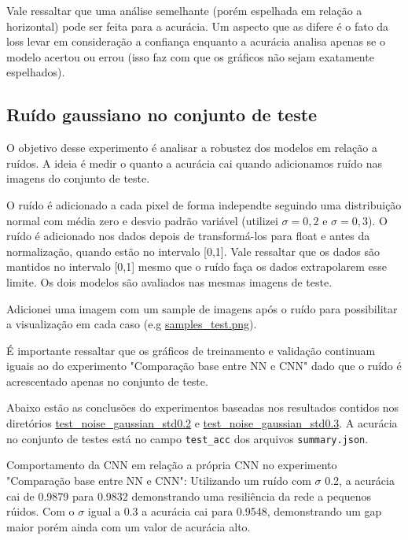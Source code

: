 \documentclass[11pt,a4paper]{article}
\begin{document}
Vale ressaltar que uma análise semelhante (porém espelhada em relação a horizontal) pode ser feita para a acurácia. Um aspecto que as difere é o fato da loss levar em consideração a confiança enquanto a acurácia analisa apenas se o modelo acertou ou errou (isso faz com que os gráficos não sejam exatamente espelhados).

\subsection{Ruído gaussiano no conjunto de teste}
O objetivo desse experimento é analisar a robustez dos modelos em relação a ruídos. A ideia é medir o quanto a acurácia cai quando adicionamos ruído nas imagens do conjunto de teste.

O ruído é adicionado a cada pixel de forma independte seguindo uma distribuição normal com média zero e desvio padrão variável (utilizei $\sigma = 0,2$ e $\sigma = 0,3$). O ruído é adicionado nos dados depois de transformá-los para float e antes da normalização, quando estão no intervalo [0,1]. Vale ressaltar que os dados são mantidos no intervalo [0,1] mesmo que o ruído faça os dados extrapolarem esse limite. Os dois modelos são avaliados nas mesmas imagens de teste. 

Adicionei uma imagem com um sample de imagens após o ruído para possibilitar a visualização em cada caso (e.g \href{https://github.com/deconr/MAC5921-DeepLearning/blob/main/ep1/results/test_noise_gaussian_std0.2/samples_test.png}{samples\_test.png}).

É importante ressaltar que os gráficos de treinamento e validação continuam iguais ao do experimento "Comparação base entre NN e CNN" dado que o ruído é acrescentado apenas no conjunto de teste.

Abaixo estão as conclusões do experimentos baseadas nos resultados contidos nos diretórios \href{https://github.com/deconr/MAC5921-DeepLearning/blob/main/ep1/results/test_noise_gaussian_std0.2}{test\_noise\_gaussian\_std0.2} e \href{https://github.com/deconr/MAC5921-DeepLearning/blob/main/ep1/results/test_noise_gaussian_std0.3}{test\_noise\_gaussian\_std0.3}. A acurácia no conjunto de testes está no campo \texttt{test\_acc} dos arquivos \texttt{summary.json}.

Comportamento da CNN em relação a própria CNN no experimento "Comparação base entre NN e CNN": Utilizando um ruído com $\sigma$ 0.2, a acurácia cai de 0.9879 para 0.9832 demonstrando uma resiliência da rede a pequenos rúidos. Com o $\sigma$ igual a 0.3 a acurácia cai para 0.9548, demonstrando um gap maior porém ainda com um valor de acurácia alto.
\end{document}
